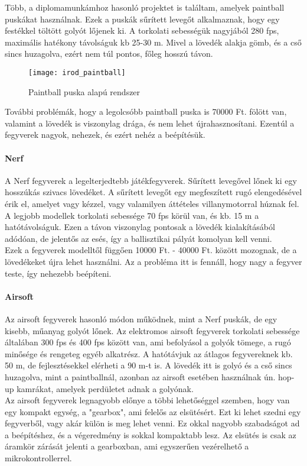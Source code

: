 Több, a diplomamunkámhoz hasonló projektet is találtam, amelyek paintball puskákat használnak. Ezek a puskák sűrített levegőt alkalmaznak, hogy egy festékkel töltött golyót lőjenek ki. A torkolati sebességük nagyjából 280 fps, maximális hatékony távolságuk kb 25-30 m. Mivel a lövedék alakja gömb, és a cső sincs huzagolva, ezért nem túl pontos, főleg hosszú távon.\\

\begin{figure}[h!]
	\centering
	\texttt{[image: irod\_paintball]}
	\caption{Paintball puska alapú rendszer \cite{paintballrobot}}
	\label{fig:irod_paintball}
\end{figure}

További problémák, hogy a legolcsóbb paintball puska is 70000 Ft. fölött van, valamint a lövedék is viszonylag drága, és nem lehet újrahasznosítani. Ezentúl a fegyverek nagyok, nehezek, és ezért nehéz a beépítésük. 


\paragraph{Nerf \cite{nerf}}

A Nerf fegyverek a legelterjedtebb játékfegyverek. Sűrített levegővel lőnek ki egy hosszúkás szivacs lövedéket. A sűrített levegőt egy megfeszített rugó elengedésével érik el, amelyet vagy kézzel, vagy valamilyen áttételes villanymotorral húznak fel. A legjobb modellek torkolati sebessége 70 fps körül van, és kb. 15 m a hatótávolságuk. Ezen a távon viszonylag pontosak a lövedék kialakításából adódóan, de jelentős az esés, így a ballisztikai pályát komolyan kell venni. \\

Ezek a fegyverek modelltől függően 10000 Ft. - 40000 Ft. között mozognak, de a lövedékeket újra lehet használni. Az a probléma itt is fennáll, hogy nagy a fegyver teste, így nehezebb beépíteni. 

\paragraph{Airsoft \cite{airsoft}}

Az airsoft fegyverek hasonló módon működnek, mint a Nerf puskák, de egy kisebb, műanyag golyót lőnek. Az elektromos airsoft fegyverek torkolati sebessége általában 300 fps és 400 fps között van, ami befolyásol a golyók tömege, a rugó minősége és rengeteg egyéb alkatrész. A hatótávjuk az átlagos fegyvereknek kb. 50 m, de fejlesztésekkel elérheti a 90 m-t is. A lövedék itt is golyó és a cső sincs huzagolva, mint a paintballnál, azonban az airsoft esetében használnak ún. hop-up kamrákat, amelyek perdületet adnak a golyónak.\\

Az airsoft fegyverek legnagyobb előnye a többi lehetőséggel szemben, hogy van egy kompakt egység, a "gearbox", ami felelős az elsütésért. Ezt ki lehet szedni egy fegyverből, vagy akár külön is meg lehet venni. Ez okkal nagyobb szabadságot ad a beépítéshez, és a végeredmény is sokkal kompaktabb lesz. Az elsütés is csak az áramkör zárását jelenti a gearboxban, ami egyszerűen vezérelhető a mikrokontrollerrel.